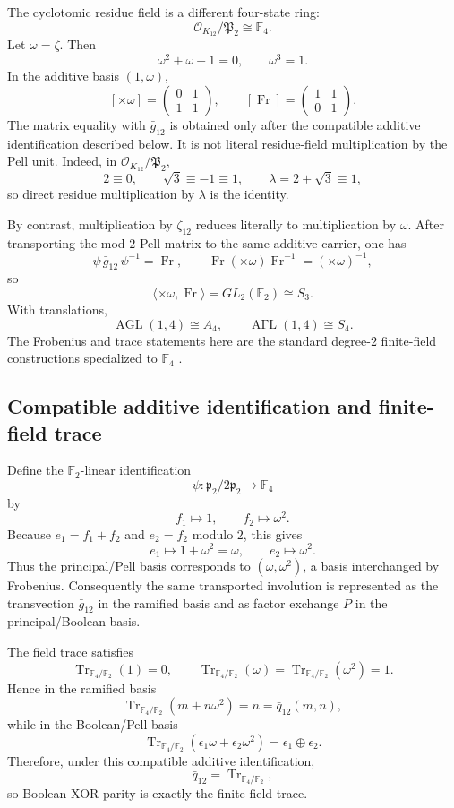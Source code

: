 \documentclass[11pt]{article}
\theoremstyle{remark}
\newcommand{\F}{\mathbb F}
\newcommand{\OO}{\mathcal O}
\newcommand{\Fr}{\operatorname{Fr}}
\newcommand{\Tr}{\operatorname{Tr}}
\begin{document}
The cyclotomic residue field is a different four-state ring:
\[
\boxed{\OO_{K_{12}}/\mathfrak P_2\cong\F_4.}
\]
Let $\omega=\bar\zeta$.  Then
\[
\omega^2+\omega+1=0,
\qquad \omega^3=1.
\]
In the additive basis $(1,\omega)$,
\[
[\times\omega]=\begin{pmatrix}0&1\\1&1\end{pmatrix},
\qquad
[\Fr]=\begin{pmatrix}1&1\\0&1\end{pmatrix}.
\]
The matrix equality with $\bar g_{12}$ is obtained only after the compatible
additive identification described below.  It is not literal residue-field
multiplication by the Pell unit.  Indeed, in $\OO_{K_{12}}/\mathfrak P_2$,
\[
2\equiv0,
\qquad
\sqrt3\equiv-1\equiv1,
\qquad
\lambda=2+\sqrt3\equiv1,
\]
so direct residue multiplication by $\lambda$ is the identity.

By contrast, multiplication by $\zeta_{12}$ reduces literally to
multiplication by $\omega$.  After transporting the mod-$2$ Pell matrix to the
same additive carrier, one has
\[
\boxed{\psi\,\bar g_{12}\,\psi^{-1}=\Fr},
\qquad
\Fr(\times\omega)\Fr^{-1}=(\times\omega)^{-1},
\]
so
\[
\langle\times\omega,\Fr\rangle
=GL_2(\F_2)\cong S_3.
\]
With translations,
\[
\operatorname{AGL}(1,4)\cong A_4,
\qquad
\operatorname{A\Gamma L}(1,4)\cong S_4.
\]
The Frobenius and trace statements here are the standard degree-$2$
finite-field constructions specialized to $\F_4$ \cite{LidlNiederreiter}.

\subsection{Compatible additive identification and finite-field trace}

Define the $\F_2$-linear identification
\[
\psi:\mathfrak p_2/2\mathfrak p_2\longrightarrow\F_4
\]
by
\[
\boxed{f_1\longmapsto1,
\qquad f_2\longmapsto\omega^2.}
\]
Because $e_1=f_1+f_2$ and $e_2=f_2$ modulo $2$, this gives
\[
e_1\longmapsto1+\omega^2=\omega,
\qquad
e_2\longmapsto\omega^2.
\]
Thus the principal/Pell basis corresponds to $(\omega,\omega^2)$, a basis
interchanged by Frobenius.  Consequently the same transported involution is
represented as the transvection $\bar g_{12}$ in the ramified basis and as
factor exchange $P$ in the principal/Boolean basis.

The field trace satisfies
\[
\Tr_{\F_4/\F_2}(1)=0,
\qquad
\Tr_{\F_4/\F_2}(\omega)
=\Tr_{\F_4/\F_2}(\omega^2)=1.
\]
Hence in the ramified basis
\[
\Tr_{\F_4/\F_2}(m+n\omega^2)=n=\bar q_{12}(m,n),
\]
while in the Boolean/Pell basis
\[
\boxed{
\Tr_{\F_4/\F_2}
(\epsilon_1\omega+\epsilon_2\omega^2)
=\epsilon_1\oplus\epsilon_2.}
\]
Therefore, under this compatible additive identification,
\[
\boxed{\bar q_{12}=\Tr_{\F_4/\F_2},}
\]
so Boolean XOR parity is exactly the finite-field trace.
\end{document}
